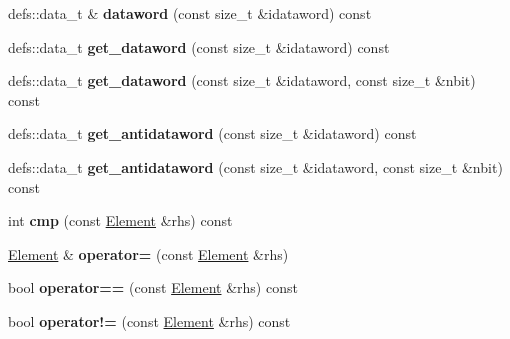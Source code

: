 \begin{DoxyCompactItemize}
\item 
defs\+::data\+\_\+t \& {\bfseries dataword} (const size\+\_\+t \&idataword) const \hypertarget{classElement_a2ea1802af0c80e1ae4d50dde26b768cd}{}\label{classElement_a2ea1802af0c80e1ae4d50dde26b768cd}

\item 
defs\+::data\+\_\+t {\bfseries get\+\_\+dataword} (const size\+\_\+t \&idataword) const \hypertarget{classElement_a60bffb4917907c0666faa2d63f7a9b03}{}\label{classElement_a60bffb4917907c0666faa2d63f7a9b03}

\item 
defs\+::data\+\_\+t {\bfseries get\+\_\+dataword} (const size\+\_\+t \&idataword, const size\+\_\+t \&nbit) const \hypertarget{classElement_a02754ff9c5e1c6339387c1055bd58ff0}{}\label{classElement_a02754ff9c5e1c6339387c1055bd58ff0}

\item 
defs\+::data\+\_\+t {\bfseries get\+\_\+antidataword} (const size\+\_\+t \&idataword) const \hypertarget{classElement_a71940579c45a95b3e10f4573d04e00bd}{}\label{classElement_a71940579c45a95b3e10f4573d04e00bd}

\item 
defs\+::data\+\_\+t {\bfseries get\+\_\+antidataword} (const size\+\_\+t \&idataword, const size\+\_\+t \&nbit) const \hypertarget{classElement_ae9c0921740d89731f4948c7da1087e4b}{}\label{classElement_ae9c0921740d89731f4948c7da1087e4b}

\item 
int {\bfseries cmp} (const \hyperlink{classElement}{Element} \&rhs) const \hypertarget{classElement_aca814eb1fa9444de47a9709019ccadbb}{}\label{classElement_aca814eb1fa9444de47a9709019ccadbb}

\item 
\hyperlink{classElement}{Element} \& {\bfseries operator=} (const \hyperlink{classElement}{Element} \&rhs)\hypertarget{classElement_a4ad595ed742ac39b2f36fa18ec16097c}{}\label{classElement_a4ad595ed742ac39b2f36fa18ec16097c}

\item 
bool {\bfseries operator==} (const \hyperlink{classElement}{Element} \&rhs) const \hypertarget{classElement_a644fb51331605fc442fb7b8927b4b6b5}{}\label{classElement_a644fb51331605fc442fb7b8927b4b6b5}

\item 
bool {\bfseries operator!=} (const \hyperlink{classElement}{Element} \&rhs) const \hypertarget{classElement_a46ebb3ceb148b0031deeb865d09a1dd6}{}\label{classElement_a46ebb3ceb148b0031deeb865d09a1dd6}


\end{DoxyCompactItemize}
